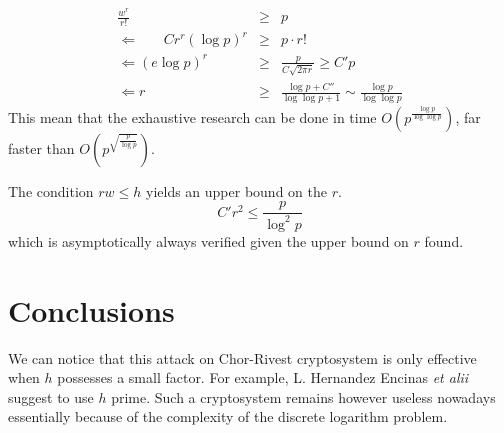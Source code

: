 \documentclass[12pt,a4paper,titlepage]{article}
\begin{document}
\begin{eqnarray*}
\frac{w^r}{r!} &\geq& p \\
\Leftarrow \ \ \ \ \ \ \ \ C r^r (\log p)^r &\geq& p \cdot r! \\
\Leftarrow (e \log p)^r &\geq& \frac{p}{C \sqrt{2\pi r}} \geq C' p \\
\Leftarrow r &\geq& \frac{\log p + C''}{\log \log p + 1} \sim \frac{\log p}{\log \log p}
\end{eqnarray*}
This mean that the exhaustive research can be done in time $O\left( p^{\frac{\log p}{\log \log p}} \right)$, far faster than $O\left(p^{\sqrt{\frac{p}{\log p}}}\right)$.

The condition $r w \leq h$ yields an upper bound on the $r$.
$$ C' r^2 \leq \frac{p}{\log^2 p}  $$
which is asymptotically always verified given the upper bound on $r$ found.




\section{Conclusions}

We can notice that this attack on Chor-Rivest cryptosystem is only effective when $h$ possesses a small factor. For example, L. Hernandez Encinas \textit{et alii} \cite{Enc04} suggest to use $h$ prime. Such a cryptosystem remains however useless nowadays essentially because of the complexity of the discrete logarithm problem.







\newpage
\appendix
\end{document}
